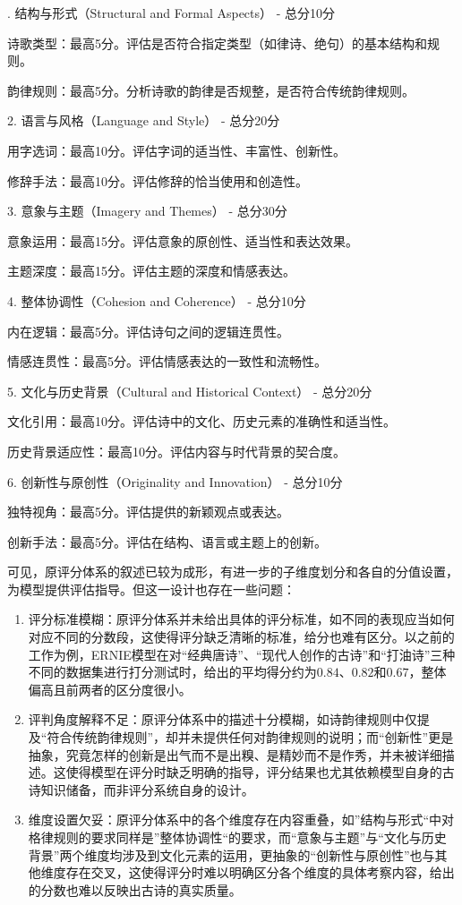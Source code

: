 {. 结构与形式（Structural and Formal Aspects） - 总分10分 \par
诗歌类型：最高5分。评估是否符合指定类型（如律诗、绝句）的基本结构和规则。 \par
韵律规则：最高5分。分析诗歌的韵律是否规整，是否符合传统韵律规则。\par
 2. 语言与风格（Language and Style） - 总分20分 \par
用字选词：最高10分。评估字词的适当性、丰富性、创新性。 \par
修辞手法：最高10分。评估修辞的恰当使用和创造性。\par
 3. 意象与主题（Imagery and Themes） - 总分30分 \par
意象运用：最高15分。评估意象的原创性、适当性和表达效果。 \par
主题深度：最高15分。评估主题的深度和情感表达。 \par
4. 整体协调性（Cohesion and Coherence） - 总分10分 \par
内在逻辑：最高5分。评估诗句之间的逻辑连贯性。 \par
情感连贯性：最高5分。评估情感表达的一致性和流畅性。 \par
5. 文化与历史背景（Cultural and Historical Context） - 总分20分 \par
文化引用：最高10分。评估诗中的文化、历史元素的准确性和适当性。 \par
历史背景适应性：最高10分。评估内容与时代背景的契合度。 \par
6. 创新性与原创性（Originality and Innovation） - 总分10分 \par
独特视角：最高5分。评估提供的新颖观点或表达。 \par
创新手法：最高5分。评估在结构、语言或主题上的创新。 \par
}

可见，原评分体系的叙述已较为成形，有进一步的子维度划分和各自的分值设置，为模型提供评估指导。但这一设计也存在一些问题：
\begin{enumerate}
  \item 评分标准模糊：原评分体系并未给出具体的评分标准，如不同的表现应当如何对应不同的分数段，这使得评分缺乏清晰的标准，给分也难有区分。以之前的工作为例，ERNIE模型在对“经典唐诗”、“现代人创作的古诗”和“打油诗”三种不同的数据集进行打分测试时，给出的平均得分约为$0.84$、$0.82$和$0.67$，整体偏高且前两者的区分度很小。
  \item 评判角度解释不足：原评分体系中的描述十分模糊，如诗韵律规则中仅提及“符合传统韵律规则”，却并未提供任何对韵律规则的说明；而“创新性”更是抽象，究竟怎样的创新是出气而不是出糗、是精妙而不是作秀，并未被详细描述。这使得模型在评分时缺乏明确的指导，评分结果也尤其依赖模型自身的古诗知识储备，而非评分系统自身的设计。
  \item 维度设置欠妥：原评分体系中的各个维度存在内容重叠，如”结构与形式“中对格律规则的要求同样是”整体协调性“的要求，而“意象与主题”与“文化与历史背景”两个维度均涉及到文化元素的运用，更抽象的“创新性与原创性”也与其他维度存在交叉，这使得评分时难以明确区分各个维度的具体考察内容，给出的分数也难以反映出古诗的真实质量。
\end{enumerate}

